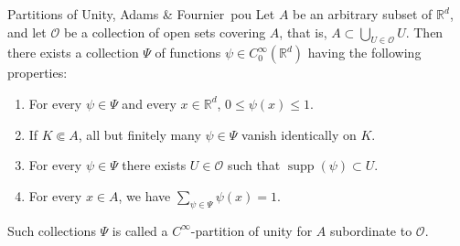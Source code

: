 \documentclass[a4paper, 11pt]{article}
\theoremstyle{remark}
\begin{document}
\begin{theorem}{Partitions of Unity, Adams \& Fournier~\cite{AdamsFournier2003}}{pou}
    Let $A$ be an arbitrary subset of $\mathbb{R}^{d}$, and let $\mathcal{O}$ be a collection of open sets covering $A$, that is, $A \subset \bigcup_{U\in \mathcal{O}}U$. Then there exists a collection $\Psi$ of functions $\psi\in C_{0}^{\infty}(\mathbb{R}^{d})$ having the following properties:
    \begin{enumerate}[label = (\roman*)]
        \item For every $\psi\in \Psi$ and every $x\in \mathbb{R}^{d}$, $0\leq \psi(x)\leq 1$.
        \item If $K\Subset A$, all but finitely many $\psi\in \Psi$ vanish identically on $K$.
        \item For every $\psi\in\Psi$ there exists $U\in \mathcal{O}$ such that $\operatorname{supp}(\psi)\subset U$.
        \item For every $x\in A$, we have $\sum_{\psi\in \Psi}\psi(x) = 1$.
    \end{enumerate}
    Such collections $\Psi$ is called a $C^{\infty}$-partition of unity for $A$ subordinate to $\mathcal{O}$.
\end{theorem}
\end{document}
